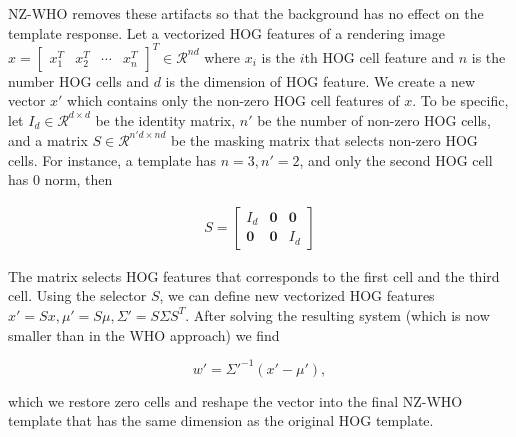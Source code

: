 NZ-WHO removes these artifacts so that the background has no effect on the
template response. Let a vectorized HOG features of a rendering image $x = [ \begin{array}{ccccc}x_1^T & x_2^T & \cdots & x_n^T\end{array} ]^T \in
\mathcal{R}^{nd}$ where $x_i$ is the $i$th HOG cell feature and $n$ is the number HOG cells and $d$ is
the dimension of HOG feature. We create a new vector $x'$ which contains only
the non-zero HOG cell features of $x$. To be specific, let $I_d\in \mathcal{R}^{d\times
    d}$ be the identity matrix, $n'$ be the number of non-zero HOG cells, and a
matrix $S\in \mathcal{R}^{n'd \times nd}$ be the masking matrix that selects
non-zero HOG cells. For instance, a template has  $n=3, n'=2$, and only the
second HOG cell has $0$ norm, then

\begin{align}
    S = \left[ \begin{array}{ccc}
        I_d & \mathbf{0} & \mathbf{0}\\
        \mathbf{0} & \mathbf{0} & I_d
        \end{array} \right]
\end{align}

The matrix selects HOG features that corresponds to the first cell and the third cell. Using the selector $S$, we can define new vectorized HOG features $x' = S x, \mu' = S\mu, \Sigma' = S \Sigma S^T$.
After solving the resulting system (which is now smaller than
in the WHO approach) we find

\begin{equation}
w'=\Sigma'^{-1}(x' - \mu') \label{eq:nz-who},
\end{equation}

which we restore zero cells and reshape the vector into the final NZ-WHO
template that has the same dimension as the original HOG template.


